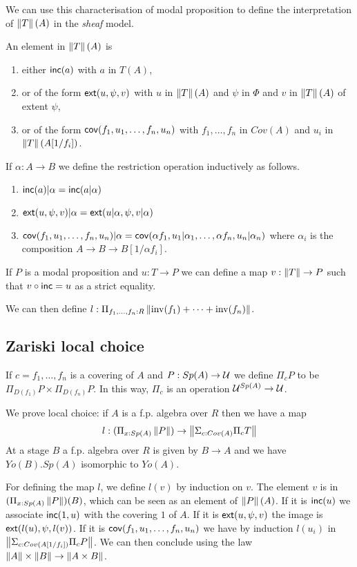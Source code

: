 \medskip

We can use this characterisation of modal proposition to define the interpretation of
$\left\lVert T \right\rVert(A)$ in the {\em sheaf} model.

An element in $\left\lVert T \right\rVert(A)$ is
\begin{enumerate}
\item either $\mathsf{inc}(a)$ with $a$ in $T(A)$,
\item or of the form $\mathsf{ext}(u,\psi,v)$ with $u$ in $\left\lVert T \right\rVert(A)$ and $\psi$ in $\Phi$ and
  $v$ in $\left\lVert T \right\rVert(A)$ of extent $\psi$,
\item or of the form $\mathsf{cov}(f_1,u_1,\dots,f_n,u_n)$ with $f_1,\dots,f_n$ in $Cov(A)$ and $u_i$ in $\left\lVert T \right\rVert(A[1/f_i])$.
\end{enumerate}

If $\alpha:A\rightarrow B$ we define the restriction operation inductively as follows.
\begin{enumerate}
\item $\mathsf{inc}(a)|\alpha = \mathsf{inc}(a|\alpha)$
\item $\mathsf{ext}(u,\psi,v)|\alpha = \mathsf{ext}(u|\alpha,\psi,v|\alpha)$
\item $\mathsf{cov}(f_1,u_1,\dots,f_n,u_n)|\alpha = \mathsf{cov}(\alpha f_1,u_1|\alpha_1,\dots,\alpha f_n,u_n|\alpha_n)$ where
  $\alpha_i$ is the composition $A\rightarrow B\rightarrow B[1/\alpha f_i]$.
\end{enumerate}

If $P$ is a modal proposition and $u:T\rightarrow P$ we can define a map $v:\left\lVert T \right\rVert\rightarrow P$
such that $v\circ\mathsf{inc} = u$ as a strict equality.

We can then define $l:\Pi_{f_1,\dots,f_n:R}\left\lVert \mathrm{inv}(f_1)+\dots+\mathrm{inv}(f_n) \right\rVert$.

\subsection{Zariski local choice}

If $c = f_1,\dots,f_n$ is a covering of $A$ and $P:Sp(A)\rightarrow \mathcal{U}$ we define
$\Pi_c P$ to be $\Pi_{D(f_1)}P\times\Pi_{D(f_n)}P$. In this way, $\Pi_c$ is an operation
$\mathcal{U}^{Sp(A)}\rightarrow\mathcal{U}$.

We prove local choice: if $A$ is a f.p. algebra over $R$ then we have a map
$$
l:(\Pi_{x:Sp(A)}\left\lVert P \right\rVert)\rightarrow \left\lVert \Sigma_{c:Cov(A)}\Pi_cT \right\rVert
$$
At a stage $B$ a f.p. algebra over $R$ is given by $B\rightarrow A$ and we have $Yo(B).Sp(A)$ isomorphic
to $Yo(A)$.

For defining the map $l$, we define $l(v)$ by induction on $v$.
The element $v$ is in $(\Pi_{x:Sp(A)}\left\lVert P \right\rVert)(B)$, which can be seen as
an element of $\left\lVert P \right\rVert(A)$. If it is $\mathsf{inc}(u)$ we associate $\mathsf{inc}(1,u)$ with the covering $1$ of $A$.
If it is $\mathsf{ext}(u,\psi,v)$ the image is $\mathsf{ext}(l(u),\psi,l(v))$.
If it is $\mathsf{cov}(f_1,u_1,\dots,f_n,u_n)$ we have by induction $l(u_i)$ in $\left\lVert \Sigma_{c:Cov(A[1/f_i])}\Pi_c P \right\rVert$.
We can then conclude using the law $\left\lVert A \right\rVert\times \left\lVert B \right\rVert\rightarrow\left\lVert A\times B \right\rVert$.

